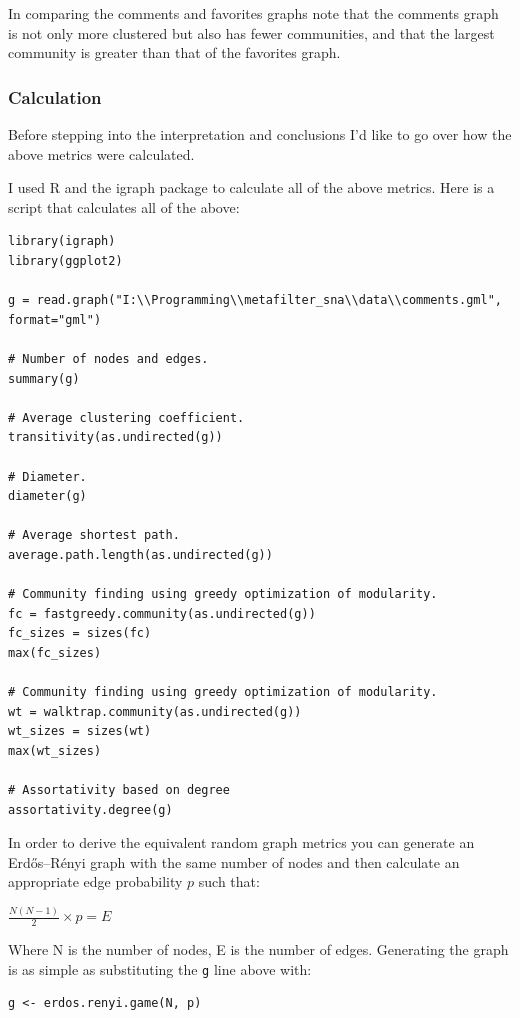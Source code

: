 In comparing the comments and favorites graphs note that the comments
graph is not only more clustered but also has fewer communities, and
that the largest community is greater than that of the favorites graph.

\subsubsection{Calculation}

Before stepping into the interpretation and conclusions I'd like to go
over how the above metrics were calculated.

I used R and the igraph package to calculate all of the above metrics.
Here is a script that calculates all of the above:

\begin{verbatim}
library(igraph)
library(ggplot2)

g = read.graph("I:\\Programming\\metafilter_sna\\data\\comments.gml", format="gml")

# Number of nodes and edges.
summary(g)

# Average clustering coefficient.
transitivity(as.undirected(g))

# Diameter.
diameter(g)

# Average shortest path.
average.path.length(as.undirected(g))

# Community finding using greedy optimization of modularity.
fc = fastgreedy.community(as.undirected(g))    
fc_sizes = sizes(fc)
max(fc_sizes)

# Community finding using greedy optimization of modularity.
wt = walktrap.community(as.undirected(g))
wt_sizes = sizes(wt)
max(wt_sizes)

# Assortativity based on degree
assortativity.degree(g)
\end{verbatim}

In order to derive the equivalent random graph metrics you can generate
an Erdős--Rényi graph with the same number of nodes and then calculate
an appropriate edge probability $p$ such that:

$\frac{N(N-1)}{2} \times p = E$

Where N is the number of nodes, E is the number of edges. Generating the
graph is as simple as substituting the \texttt{g} line above with:

\begin{verbatim}
g <- erdos.renyi.game(N, p)
\end{verbatim}

